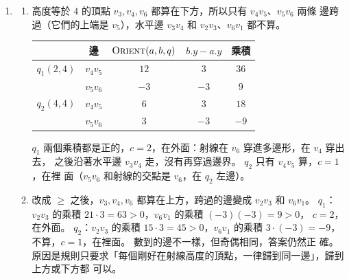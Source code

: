 \begin{enumerate}
\item
\begin{enumerate}
\item 高度等於 $4$ 的頂點 $v_3, v_4, v_6$ 都算在下方，所以只有 $v_4 v_5$、$v_5 v_6$ 兩條
邊跨過（它們的上端是 $v_5$），水平邊 $v_3 v_4$ 和 $v_2 v_3$、$v_6 v_1$ 都不算。
\begin{center}
\begin{tabular}{lcccc}
\toprule
& 邊 & $\proc{Orient}(a, b, q)$ & $b.y - a.y$ & 乘積 \\
\midrule
$q_1(2, 4)$ & $v_4 v_5$ & $12$ & $3$ & $36$ \\
& $v_5 v_6$ & $-3$ & $-3$ & $9$ \\
\midrule
$q_2(4, 4)$ & $v_4 v_5$ & $6$ & $3$ & $18$ \\
& $v_5 v_6$ & $3$ & $-3$ & $-9$ \\
\bottomrule
\end{tabular}
\end{center}
$q_1$ 兩個乘積都是正的，$c = 2$，在外面：射線在 $v_6$ 穿進多邊形，在 $v_4$ 穿出去，
之後沿著水平邊 $v_3 v_4$ 走，沒有再穿過邊界。 $q_2$ 只有 $v_4 v_5$ 算，$c = 1$，在裡
面（$v_5 v_6$ 和射線的交點是 $v_6$，在 $q_2$ 左邊）。
\item 改成 $\ge$ 之後，$v_3, v_4, v_6$ 都算在上方，跨過的邊變成 $v_2 v_3$ 和 $v_6 v_1$。
$q_1$：$v_2 v_3$ 的乘積 $21 \cdot 3 = 63 > 0$，$v_6 v_1$ 的乘積 $(-3)(-3) = 9 > 0$，
$c = 2$，在外面。 $q_2$：$v_2 v_3$ 的乘積 $15 \cdot 3 = 45 > 0$，$v_6 v_1$ 的乘積
$3 \cdot (-3) = -9$，不算，$c = 1$，在裡面。 數到的邊不一樣，但奇偶相同，答案仍然正
確。 原因是規則只要求「每個剛好在射線高度的頂點，一律歸到同一邊」，歸到上方或下方都
可以。
\end{enumerate}


\end{enumerate}
